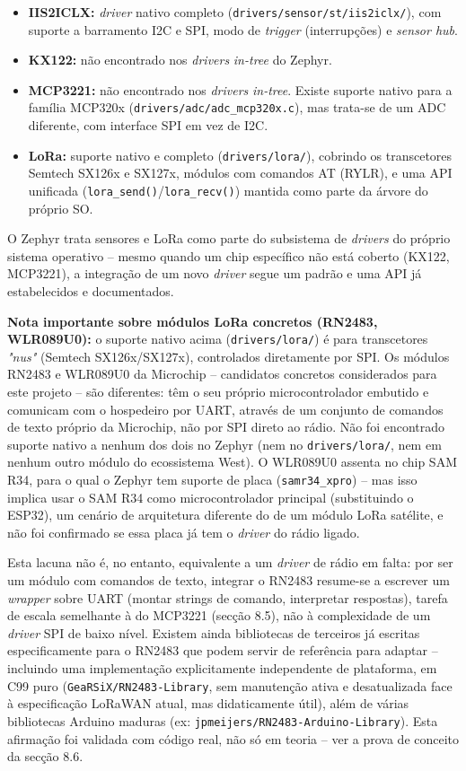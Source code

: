 \documentclass[a4paper,12pt]{article}
\begin{document}
\begin{itemize}
    \item \textbf{IIS2ICLX:} \textit{driver} nativo completo (\texttt{drivers/sensor/st/iis2iclx/}), com suporte a barramento I2C e SPI, modo de \textit{trigger} (interrupções) e \textit{sensor hub}.
    \item \textbf{KX122:} não encontrado nos \textit{drivers} \textit{in-tree} do Zephyr.
    \item \textbf{MCP3221:} não encontrado nos \textit{drivers} \textit{in-tree}. Existe suporte nativo para a família MCP320x (\texttt{drivers/adc/adc\_mcp320x.c}), mas trata-se de um ADC diferente, com interface SPI em vez de I2C.
    \item \textbf{LoRa:} suporte nativo e completo (\texttt{drivers/lora/}), cobrindo os transcetores Semtech SX126x e SX127x, módulos com comandos AT (RYLR), e uma API unificada (\texttt{lora\_send()}/\texttt{lora\_recv()}) mantida como parte da árvore do próprio SO.
\end{itemize}

O Zephyr trata sensores e LoRa como parte do subsistema de \textit{drivers} do próprio sistema operativo -- mesmo quando um chip específico não está coberto (KX122, MCP3221), a integração de um novo \textit{driver} segue um padrão e uma API já estabelecidos e documentados.

\textbf{Nota importante sobre módulos LoRa concretos (RN2483, WLR089U0):} o suporte nativo acima (\texttt{drivers/lora/}) é para transcetores \textit{"nus"} (Semtech SX126x/SX127x), controlados diretamente por SPI. Os módulos RN2483 e WLR089U0 da Microchip -- candidatos concretos considerados para este projeto -- são diferentes: têm o seu próprio microcontrolador embutido e comunicam com o hospedeiro por UART, através de um conjunto de comandos de texto próprio da Microchip, não por SPI direto ao rádio. Não foi encontrado suporte nativo a nenhum dos dois no Zephyr (nem no \texttt{drivers/lora/}, nem em nenhum outro módulo do ecossistema West). O WLR089U0 assenta no chip SAM R34, para o qual o Zephyr tem suporte de placa (\texttt{samr34\_xpro}) -- mas isso implica usar o SAM R34 como microcontrolador principal (substituindo o ESP32), um cenário de arquitetura diferente do de um módulo LoRa satélite, e não foi confirmado se essa placa já tem o \textit{driver} do rádio ligado.

Esta lacuna não é, no entanto, equivalente a um \textit{driver} de rádio em falta: por ser um módulo com comandos de texto, integrar o RN2483 resume-se a escrever um \textit{wrapper} sobre UART (montar strings de comando, interpretar respostas), tarefa de escala semelhante à do MCP3221 (secção 8.5), não à complexidade de um \textit{driver} SPI de baixo nível. Existem ainda bibliotecas de terceiros já escritas especificamente para o RN2483 que podem servir de referência para adaptar -- incluindo uma implementação explicitamente independente de plataforma, em C99 puro (\texttt{GeaRSiX/RN2483-Library}, sem manutenção ativa e desatualizada face à especificação LoRaWAN atual, mas didaticamente útil), além de várias bibliotecas Arduino maduras (ex: \texttt{jpmeijers/RN2483-Arduino-Library}). Esta afirmação foi validada com código real, não só em teoria -- ver a prova de conceito da secção 8.6.
\end{document}
